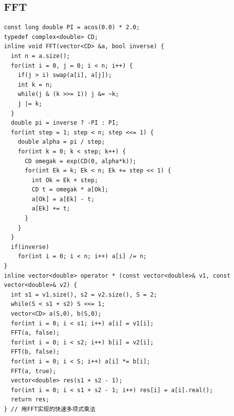 \documentclass[10pt,landscape]{article}
\begin{document}
\begin{multicols}{2}
\subsection{FFT}
\begin{lstlisting}
const long double PI = acos(0.0) * 2.0;
typedef complex<double> CD;
inline void FFT(vector<CD> &a, bool inverse) {
  int n = a.size();
  for(int i = 0, j = 0; i < n; i++) {
    if(j > i) swap(a[i], a[j]);
    int k = n;
    while(j & (k >>= 1)) j &= ~k;
    j |= k;
  }
  double pi = inverse ? -PI : PI;
  for(int step = 1; step < n; step <<= 1) {
    double alpha = pi / step;
    for(int k = 0; k < step; k++) {
      CD omegak = exp(CD(0, alpha*k)); 
      for(int Ek = k; Ek < n; Ek += step << 1) { 
        int Ok = Ek + step; 
        CD t = omegak * a[Ok];
        a[Ok] = a[Ek] - t; 
        a[Ek] += t;
      }
    }
  }
  if(inverse)
    for(int i = 0; i < n; i++) a[i] /= n;
}
inline vector<double> operator * (const vector<double>& v1, const vector<double>& v2) {
  int s1 = v1.size(), s2 = v2.size(), S = 2;
  while(S < s1 + s2) S <<= 1;
  vector<CD> a(S,0), b(S,0); 
  for(int i = 0; i < s1; i++) a[i] = v1[i];
  FFT(a, false);
  for(int i = 0; i < s2; i++) b[i] = v2[i];
  FFT(b, false);
  for(int i = 0; i < S; i++) a[i] *= b[i];
  FFT(a, true);
  vector<double> res(s1 + s2 - 1);
  for(int i = 0; i < s1 + s2 - 1; i++) res[i] = a[i].real(); 
  return res;
} // 用FFT实现的快速多项式乘法
\end{lstlisting}


\end{multicols}
\end{document}
